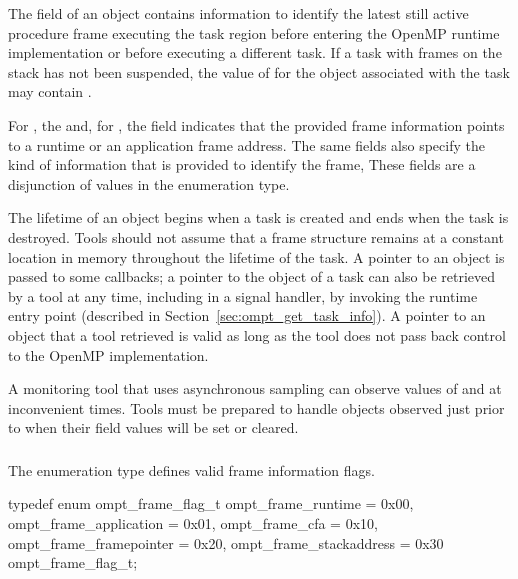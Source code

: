 The  field of an  object contains
information to identify the latest still active procedure frame 
executing the task region before entering the OpenMP runtime 
implementation or before executing a different task. If a task with 
frames on the stack has not been suspended, the value of  
for the  object associated with the task may 
contain .

For , the  and, for ,
the  field indicates that the provided frame information 
points to a runtime or an application frame address. The same fields also 
specify the kind of information that is provided to identify the frame, These 
fields are a disjunction of values in the  enumeration type.

The lifetime of an  object begins when a task is created
and ends when the task is destroyed. Tools should not assume that
a frame structure remains at a constant location in memory throughout the
lifetime of the task. A pointer to an  object is passed 
to some callbacks; a pointer to the  object of a task
can also be retrieved by a tool at any time, including in a signal
handler, by invoking the  runtime entry point 
(described in Section~\ref{sec:ompt_get_task_info}). A pointer to an 
 object that a tool retrieved is valid as long as 
the tool does not pass back control to the OpenMP implementation.

\begin{note}
A monitoring tool that uses asynchronous sampling can observe values
of  and  at inconvenient times.
Tools must be prepared to handle  objects observed 
just prior to when their field values will be set or cleared.
\end{note}



\subsubsection{}
\label{subsubsec:ompt_frame_flag_t}

\summary
The  enumeration type defines valid frame 
information flags.

\format
\begin{ccppspecific}
\begin{ompSyntax}
typedef enum ompt_frame_flag_t {
  ompt_frame_runtime        = 0x00,
  ompt_frame_application    = 0x01,
  ompt_frame_cfa            = 0x10,
  ompt_frame_framepointer   = 0x20,
  ompt_frame_stackaddress   = 0x30
} ompt_frame_flag_t; 
\end{ompSyntax}
\end{ccppspecific}

